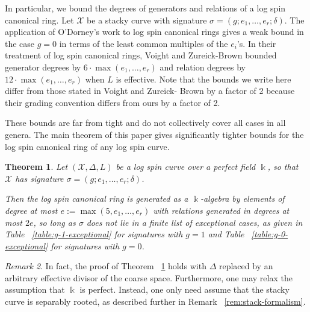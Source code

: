 \documentclass{amsart}
\theoremstyle{plain}
\newtheorem{thm}{Theorem}[section]
\theoremstyle{definition}
\theoremstyle{remark}
\newtheorem{rem}[thm]{Remark}
\numberwithin{equation}{section}
\newcommand\Bk{{\Bbbk}}
\DeclareMathOperator\di{Div}
\newcommand\sx{\mathscr X}
\newcommand \subhalf[1]{\frac{{#1} - 1}{2{#1}}}
\newcommand{\halfcan}{L}
\begin{document}

In particular, we bound the degrees of generators and relations of
a log spin canonical ring. Let $\sx$ be a stacky curve with
signature $\sigma = (g; e_1, \ldots, e_r; \delta)$. The application
of O'Dorney's work \cite[Chapter 5]{dorney:canonical} to log spin
canonical rings gives a weak bound in the case $g = 0$ in terms of
the least common multiples of the $e_i$'s. In their treatment of
log spin canonical rings, Voight and Zureick-Brown
\cite[Corollary 10.4.6]{vzb:stacky} bounded generator degrees by $6
\cdot \max(e_1, \ldots, e_r)$ and relation degrees by $12 \cdot \max
(e_1, \ldots, e_ r)$ when $\halfcan$ is effective. Note that the
bounds we write here differ from those stated in Voight and Zureick-
Brown \cite[Corollary 10.4.6]{vzb:stacky} by a factor of 2 because
their grading convention differs from ours by a factor of 2.

These bounds are far from tight and do not collectively
cover all cases in all genera. The main theorem of this paper
gives significantly tighter bounds for the log spin canonical ring
of any log spin curve.

\begin{thm}
\label{thm:main}
Let $(\sx, \Delta, \halfcan)$ be a log spin curve over a perfect
field $\Bk$, so that $\sx$ has signature $\sigma = (g; e_1, \ldots,
e_r; \delta)$.

Then the log spin canonical ring is generated as a $\Bk$-algebra by 
elements of degree at most $e := \max(5, e_1, \ldots, e_r)$ with
relations generated in degrees at most $2e$,
so long as $\sigma$ does not lie in a finite list of exceptional
cases, as given in Table ~\ref{table:g-1-exceptional} for
signatures with $g = 1$ and Table ~\ref{table:g-0-exceptional} for
signatures with $g = 0$.
\end{thm}

\begin{rem}
\label{rem:main-weaker-assumptions}
In fact, the proof of Theorem ~\ref{thm:main} holds with $\Delta$ replaced by an arbitrary effective divisor of the coarse space.
 Furthermore, one may relax the assumption that $\Bk$ is perfect. Instead, one only need assume that the stacky curve
is separably rooted, as described further in Remark ~\ref{rem:stack-formalism}.
\end{rem}
\end{document}
